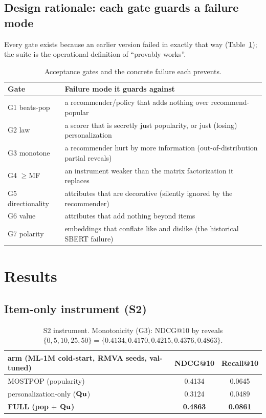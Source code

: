 \subsection{Design rationale: each gate guards a failure mode}
Every gate exists because an earlier version failed in exactly that way (Table~\ref{tab:gaterat}); the suite is the
operational definition of ``provably works''.
\begin{table}[h]\centering\small
\begin{tabular}{ll}
\toprule
Gate & Failure mode it guards against\\
\midrule
G1 beats-pop & a recommender/policy that adds nothing over recommend-popular\\
G2 law & a scorer that is secretly just popularity, or just (losing) personalization\\
G3 monotone & a recommender hurt by more information (out-of-distribution partial reveals)\\
G4 $\ge$MF & an instrument weaker than the matrix factorization it replaces\\
G5 directionality & attributes that are decorative (silently ignored by the recommender)\\
G6 value & attributes that add nothing beyond items\\
G7 polarity & embeddings that conflate like and dislike (the historical SBERT failure)\\
\bottomrule
\end{tabular}
\caption{Acceptance gates and the concrete failure each prevents.}
\label{tab:gaterat}
\end{table}

\section{Results}\label{sec:results}

\subsection{Item-only instrument (S2)}
\begin{table}[h]\centering\small
\begin{tabular}{lcc}
\toprule
arm (ML-1M cold-start, RMVA seeds, val-tuned) & NDCG@10 & Recall@10\\
\midrule
MOSTPOP (popularity) & 0.4134 & 0.0645\\
personalization-only ($\mathbf{Q}\mathbf{u}$) & 0.3124 & 0.0489\\
\textbf{FULL (pop $+$ $\mathbf{Q}\mathbf{u}$)} & \textbf{0.4863} & \textbf{0.0861}\\
\bottomrule
\end{tabular}
\caption{S2 instrument. Monotonicity (G3): NDCG@10 by reveals $\{0,5,10,25,50\}=\{0.4134,0.4170,0.4215,0.4376,0.4863\}$.}
\label{tab:s2}
\end{table}

